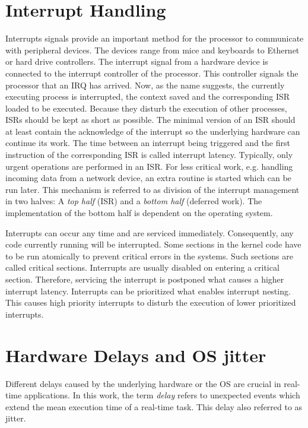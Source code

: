 \section{Interrupt Handling}\label{s_interrupt_handling}
Interrupts signals provide an important method for the processor to communicate with peripheral devices.
The devices range from mice and keyboards to Ethernet or hard drive controllers.
The interrupt signal from a hardware device is connected to the interrupt controller of the processor. 
This controller signals the processor that an \ac{IRQ} has arrived.
Now, as the name suggests, the currently executing process is interrupted, the context saved and the corresponding \ac{ISR} loaded to be executed.
Because they disturb the execution of other processes, \acp{ISR} should be kept as short as possible.
The minimal version of an \ac{ISR} should at least contain the acknowledge of the interrupt so the underlying hardware can continue its work.
The time between an interrupt being triggered and the first instruction of the corresponding \ac{ISR} is called interrupt latency.
Typically, only urgent operations are performed in an \ac{ISR}. 
For less critical work, e.g. handling incoming data from a network device, an extra routine is started which can be run later.
This mechanism is referred to as division of the interrupt management in two halves: A \textit{top half} (\ac{ISR}) and a \textit{bottom half} (deferred work).
The implementation of the bottom half is dependent on the operating system. 
\par
Interrupts can occur any time and are serviced immediately.
Consequently, any code currently running will be interrupted.
Some sections in the kernel code have to be run atomically to prevent critical errors in the systems.
Such sections are called critical sections.
Interrupts are usually disabled on entering a critical section.
Therefore, servicing the interrupt is postponed what causes a higher interrupt latency.
Interrupts can be prioritized what enables interrupt nesting.
This causes high priority interrupts to disturb the execution of lower prioritized interrupts.
 
\section{Hardware Delays and \ac{OS} jitter}\label{s_hardware_delays_and_os_jitter}
Different delays caused by the underlying hardware or the \ac{OS} are crucial in real-time applications.
In this work, the term \textit{delay} refers to unexpected events which extend the mean execution time of a real-time task.
This delay also referred to as jitter.  

